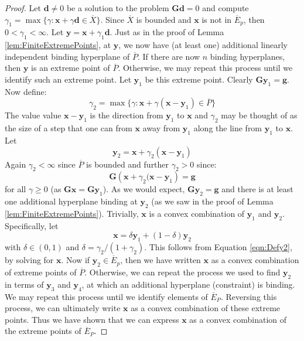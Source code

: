 \begin{proof}
Let $\mathbf{d} \neq 0$ be a solution to the problem $\mathbf{G}\mathbf{d} = 0$ and compute $\gamma_1 = \max\{\gamma : \mathbf{x} + \gamma\mathbf{d} \in \overline{X}\}$. Since $\overline{X}$ is bounded and $\mathbf{x}$ is not in $\overline{E}_p$, then $0 < \gamma_1 < \infty$. Let $\mathbf{y} = \mathbf{x} + \gamma_1\mathbf{d}$. Just as in the proof of Lemma \ref{lem:FiniteExtremePoints}, at $\mathbf{y}$, we now have (at least one) additional linearly independent binding hyperplane of $\overline{P}$. If there are now $n$ binding hyperplanes, then $\mathbf{y}$ is an extreme point of $\overline{P}$. Otherwise, we may repeat this process until we identify such an extreme point. Let $\mathbf{y}_1$ be this extreme point. Clearly $\mathbf{G}\mathbf{y}_1 = \mathbf{g}$. Now define:
\begin{displaymath}
\gamma_2 = \max\{\gamma : \mathbf{x} + \gamma(\mathbf{x} - \mathbf{y}_1) \in \overline{P}\}
\end{displaymath}
The value value $\mathbf{x} - \mathbf{y}_1$ is the direction from $\mathbf{y}_1$ to $\mathbf{x}$ and $\gamma_2$ may be thought of as the size of a step that one can from $\mathbf{x}$ away from $\mathbf{y}_1$ along the line from $\mathbf{y}_1$ to $\mathbf{x}$. Let
\begin{equation}
\mathbf{y}_2 = \mathbf{x} + \gamma_2(\mathbf{x} - \mathbf{y}_1)
\label{eqn:Defy2}
\end{equation}
Again $\gamma_2 < \infty$ since $\overline{P}$ is bounded and further $\gamma_2 > 0$ since:
\begin{equation}
\mathbf{G}\left(\mathbf{x} + \gamma_2(\mathbf{x} - \mathbf{y}_1\right) = \mathbf{g}
\end{equation}
for all $\gamma \geq 0$ (as $\mathbf{G}\mathbf{x} = \mathbf{G}\mathbf{y}_1$). As we would expect, $\mathbf{G}\mathbf{y}_2 = \mathbf{g}$ and there is at least one additional hyperplane binding at $\mathbf{y}_2$ (as we saw in the proof of Lemma \ref{lem:FiniteExtremePoints}). Trivially, $\mathbf{x}$ is a convex combination of $\mathbf{y}_1$ and $\mathbf{y}_2$. Specifically, let 
\begin{displaymath}
\mathbf{x} = \delta\mathbf{y}_1 + (1-\delta)\mathbf{y}_2
\end{displaymath}
with $\delta \in (0,1)$ and $\delta = \gamma_2/(1 + \gamma_2)$. This follows from Equation \ref{eqn:Defy2}, by solving for $\mathbf{x}$. Now if $\mathbf{y}_2 \in \overline{E}_p$, then we have written $\mathbf{x}$ as a convex combination of extreme points of $\overline{P}$. Otherwise, we can repeat the process we used to find $\mathbf{y}_2$ in terms of $\mathbf{y}_3$ and $\mathbf{y}_4$, at which an additional hyperplane (constraint) is binding. We may repeat this process until we identify elements of $\overline{E}_P$. Reversing this process, we can ultimately write $\mathbf{x}$ as a convex combination of these extreme points. Thus we have shown that we can express $\mathbf{x}$ as a convex combination of the extreme points of $\overline{E}_P$. 


\end{proof}
